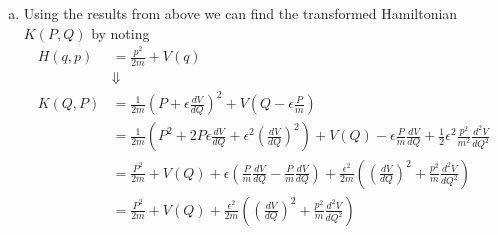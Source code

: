 \documentclass[11pt]{article}
\numberwithin{equation}{section}
\begin{document}
\begin{enumerate}[(a)]
\item Using the results from above we can find the transformed Hamiltonian $K(P,Q)$ by noting
\begin{align*}
H(q,p) &= \frac{p^2}{2m} + V(q)\\
&\Downarrow\\
K(Q,P) &= \frac{1}{2m}\left(P+\epsilon\frac{dV}{dQ}\right)^2 + V\left(Q-\epsilon\frac{P}{m}\right)\\
&= \frac{1}{2m}\left(P^2+2P\epsilon\frac{dV}{dQ}+\epsilon^2\left(\frac{dV}{dQ}\right)^2\right) + V(Q) - \epsilon\frac{P}{m}\frac{dV}{dQ} + \frac{1}{2}\epsilon^2\frac{p^2}{m^2}\frac{d^2V}{dQ^2}\\
&= \frac{P^2}{2m} + V(Q) + \epsilon\left(\frac{P}{m}\frac{dV}{dQ}-\frac{P}{m}\frac{dV}{dQ}\right) + \frac{\epsilon^2}{2m}\left(\left(\frac{dV}{dQ}\right)^2 + \frac{p^2}{m}\frac{d^2V}{dQ^2}\right)\\
&= \frac{P^2}{2m} + V(Q) +\frac{\epsilon^2}{2m}\left(\left(\frac{dV}{dQ}\right)^2 + \frac{p^2}{m}\frac{d^2V}{dQ^2}\right)
\end{align*}
\end{enumerate}

\pagebreak
\end{document}
